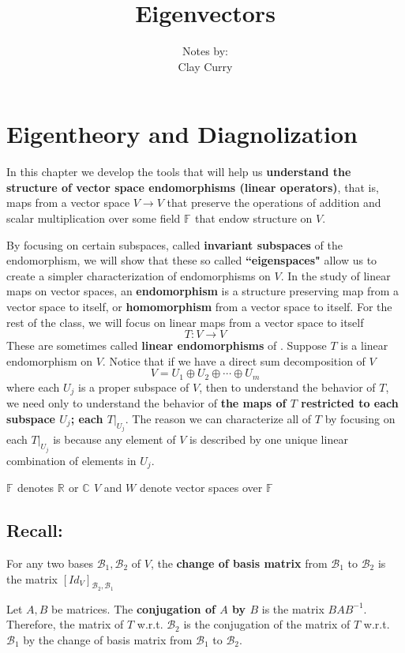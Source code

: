 \documentclass[11pt]{article} %
\title{Eigenvectors}
\author{Notes by:  \\ Clay Curry}
\date{}
\newcommand\B[1]{\text{$\mathcal{B}_{#1}$}}
\newcommand\R[1]{\text{$\mathbb{R^{#1}}$}}
\newcommand\C[1]{\text{$\mathbb{C^{#1}}$}}
\newcommand\F[1]{\text{$\mathbb{F^{#1}}$}}
\newcommand\V{\text{$V$}}
\newcommand\U{\text{$U$}}
\newcommand\W{\text{$W$}}
\newcommand\0{\text{$\mathbf{0}$}}
\begin{document}
\setcounter{section}{3}
\section{Eigentheory and Diagnolization}

In this chapter we develop the tools that will help us \textbf{understand the structure of vector space endomorphisms (linear operators)}, that is, maps from a vector space $\V \to \V$ that preserve the operations of addition and scalar multiplication over some field $\F{}$ that endow structure on $\V$. 

By focusing on certain subspaces, called \textbf{invariant subspaces} of the endomorphism, we will show that these so called \textbf{``eigenspaces"} allow us to create a simpler characterization of endomorphisms on $\V$.
{In the study of linear maps on vector spaces, an \textbf{endomorphism} is a structure preserving map from a vector space to itself, or \textbf{homomorphism} from a vector space to itself. For the rest of the class, we will focus on linear maps from a vector space to itself
$$T : \V \to \V$$
These are sometimes called \textbf{linear endomorphisms} of \V.
}
\noindent
Suppose $T$ is a linear endomorphism on $\V$. Notice that if we have a direct sum decomposition of $\V$
$$
V = \U_1 \oplus \U_2 \oplus \cdots \oplus \U_m
$$
where each $\U_j$ is a proper subspace of $\V$, then to understand the behavior of $T$, we need only to understand the behavior of \textbf{the maps of $T$ restricted to each subspace $\U_j$; each $T |_{\U_j}$}. The reason we can characterize all of $T$ by focusing on each $T |_{\U_j}$ is because any element of $\V$ is described by one unique linear combination of elements in $\U_j$.


{\points
{$\F{}$ denotes $\R{}$ or $\C{}$}
{$\V$ and $\W$ denote vector spaces over $\F{}$}
}
\subsection{Recall:}

{For any two bases $\B1,\B2$ of $\V$, the \textbf{change of basis matrix} from $\B1$ to $\B2$ is the matrix $[Id_\V]_{\B2,\B1}$}

{Let $A, B$ be matrices. The \textbf{conjugation of $A$ by $B$} is the matrix $BAB^{-1}$. Therefore, the matrix of $T$ w.r.t. $\B2$ is the conjugation of the matrix of $T$
w.r.t. $\B1$ by the change of basis matrix from $\B1$ to $\B2$.}
\end{document}
